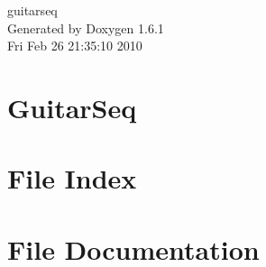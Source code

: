 \documentclass[a4paper]{book}
\begin{document}
\hypersetup{pageanchor=false}
\begin{titlepage}
\vspace*{7cm}
\begin{center}
{\Large guitarseq }\\
\vspace*{1cm}
{\large Generated by Doxygen 1.6.1}\\
\vspace*{0.5cm}
{\small Fri Feb 26 21:35:10 2010}\\
\end{center}
\end{titlepage}
\clearemptydoublepage
{}
\tableofcontents
\clearemptydoublepage
{}
\hypersetup{pageanchor=true}
\chapter{GuitarSeq}
\label{index}\hypertarget{index}{}
\chapter{File Index}

\chapter{File Documentation}















\printindex
\end{document}
